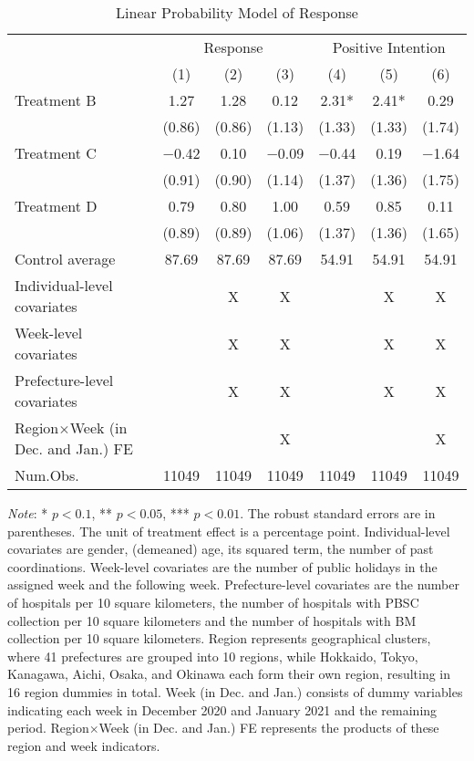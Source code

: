 \documentclass[12pt, a4paper]{article}
\begin{document}
\begin{table}[H]

\caption{\label{tab:reply-lm}Linear Probability Model of Response}
\centering
\fontsize{8}{10}\selectfont
\begin{threeparttable}
\begin{tabular}[t]{lcccccc}
\toprule
\multicolumn{1}{c}{ } & \multicolumn{3}{c}{Response} & \multicolumn{3}{c}{Positive Intention} \\
\cmidrule(l{3pt}r{3pt}){2-4} \cmidrule(l{3pt}r{3pt}){5-7}
  & (1) & (2) & (3) & (4) & (5) & (6)\\
\midrule
Treatment B & \num{1.27} & \num{1.28} & \num{0.12} & \num{2.31}* & \num{2.41}* & \num{0.29}\\
 & (\num{0.86}) & (\num{0.86}) & (\num{1.13}) & (\num{1.33}) & (\num{1.33}) & (\num{1.74})\\
Treatment C & \num{-0.42} & \num{0.10} & \num{-0.09} & \num{-0.44} & \num{0.19} & \num{-1.64}\\
 & (\num{0.91}) & (\num{0.90}) & (\num{1.14}) & (\num{1.37}) & (\num{1.36}) & (\num{1.75})\\
Treatment D & \num{0.79} & \num{0.80} & \num{1.00} & \num{0.59} & \num{0.85} & \num{0.11}\\
 & (\num{0.89}) & (\num{0.89}) & (\num{1.06}) & (\num{1.37}) & (\num{1.36}) & (\num{1.65})\\
\midrule
Control average & 87.69 & 87.69 & 87.69 & 54.91 & 54.91 & 54.91\\
Individual-level covariates &  & X & X &  & X & X\\
Week-level covariates &  & X & X &  & X & X\\
Prefecture-level covariates &  & X & X &  & X & X\\
Region$\times$Week (in Dec. and Jan.) FE &  &  & X &  &  & X\\
Num.Obs. & \num{11049} & \num{11049} & \num{11049} & \num{11049} & \num{11049} & \num{11049}\\
\bottomrule
\end{tabular}
\begin{tablenotes}
\item \emph{Note}: * $p < 0.1$, ** $p < 0.05$, *** $p < 0.01$. The robust standard errors are in parentheses. The unit of treatment effect is a percentage point. Individual-level covariates are gender, (demeaned) age, its squared term, the number of past coordinations. Week-level covariates are the number of public holidays in the assigned week and the following week. Prefecture-level covariates are the number of hospitals per 10 square kilometers, the number of hospitals with PBSC collection per 10 square kilometers and the number of hospitals with BM collection per 10 square kilometers. Region represents geographical clusters, where 41 prefectures are grouped into 10 regions, while Hokkaido, Tokyo, Kanagawa, Aichi, Osaka, and Okinawa each form their own region, resulting in 16 region dummies in total. Week (in Dec. and Jan.) consists of dummy variables indicating each week in December 2020 and January 2021 and the remaining period. Region$\times$Week (in Dec. and Jan.) FE represents the products of these region and week indicators.

\end{tablenotes}
\end{threeparttable}
\end{table}
\end{document}
